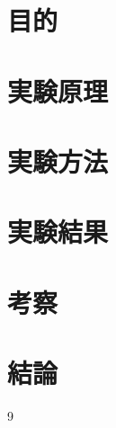 \documentclass[dvipdfmx]{jlreq}		%
\begin{document}
\thispagestyle{empty}
\clearpage
\addtocounter{page}{-1}

\section{目的}
\section{実験原理}
\section{実験方法}
\section{実験結果}
\section{考察}
\section{結論}

\begin{thebibliography}{9}
\end{thebibliography}
\end{document}
